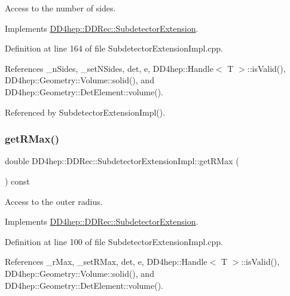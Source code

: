 Access to the number of sides. 



Implements \hyperlink{class_d_d4hep_1_1_d_d_rec_1_1_subdetector_extension_a7bed401e919e8eaaf2dfdf8fe89a3697}{D\+D4hep\+::\+D\+D\+Rec\+::\+Subdetector\+Extension}.



Definition at line 164 of file Subdetector\+Extension\+Impl.\+cpp.



References \+\_\+n\+Sides, \+\_\+set\+N\+Sides, det, e, D\+D4hep\+::\+Handle$<$ T $>$\+::is\+Valid(), D\+D4hep\+::\+Geometry\+::\+Volume\+::solid(), and D\+D4hep\+::\+Geometry\+::\+Det\+Element\+::volume().



Referenced by Subdetector\+Extension\+Impl().

\hypertarget{class_d_d4hep_1_1_d_d_rec_1_1_subdetector_extension_impl_a15bfbc17be22ce16a2f795c06c4ab571}{}\label{class_d_d4hep_1_1_d_d_rec_1_1_subdetector_extension_impl_a15bfbc17be22ce16a2f795c06c4ab571} 
\subsubsection{\texorpdfstring{get\+R\+Max()}{getRMax()}}
{\footnotesize\ttfamily double D\+D4hep\+::\+D\+D\+Rec\+::\+Subdetector\+Extension\+Impl\+::get\+R\+Max (\begin{DoxyParamCaption}{ }\end{DoxyParamCaption}) const\hspace{0.3cm}{\ttfamily [virtual]}}



Access to the outer radius. 



Implements \hyperlink{class_d_d4hep_1_1_d_d_rec_1_1_subdetector_extension_a6d7b6e1818a7ca5054279ea5d372b7f4}{D\+D4hep\+::\+D\+D\+Rec\+::\+Subdetector\+Extension}.



Definition at line 100 of file Subdetector\+Extension\+Impl.\+cpp.



References \+\_\+r\+Max, \+\_\+set\+R\+Max, det, e, D\+D4hep\+::\+Handle$<$ T $>$\+::is\+Valid(), D\+D4hep\+::\+Geometry\+::\+Volume\+::solid(), and D\+D4hep\+::\+Geometry\+::\+Det\+Element\+::volume().



